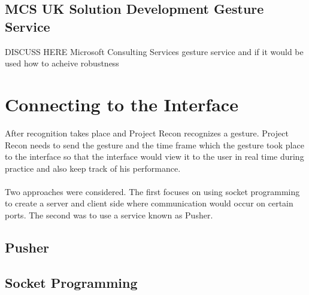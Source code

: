 \subsection{MCS UK Solution Development Gesture Service}
DISCUSS HERE Microsoft Consulting Services gesture service and if it would be used how to acheive robustness

\section{Connecting to the Interface}
After recognition takes place and Project Recon recognizes a gesture. Project Recon needs to send the gesture and the time frame which the gesture took place to the interface so that the interface would view it to the user in real time during practice and also keep track of his performance.
\\
\\
Two approaches were considered. The first focuses on using socket programming to create a server and client side where communication would occur on certain ports. The second was to use a service known as Pusher.
\subsection{Pusher}
\subsection{Socket Programming}
